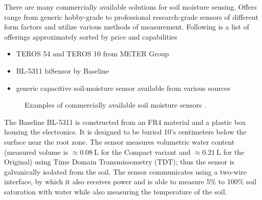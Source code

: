 
There are many commercially available solutions for soil moisture sensing. Offers range from generic hobby-grade to professional research-grade sensors of different form factors and utilize various methods of measurement. Following is a list of offerings approximately sorted by price and capabilities
\begin{itemize}
    \item TEROS 54 and TEROS 10 from METER Group \cite{meter_group_teros_2024, meter_group_teros_nodate}
    \item BL-5311 biSensor by Baseline \cite{baseline_soil_2021}
    \item generic capacitive soil-moisture sensor available from various sources \cite{czechproject_spol_sro_pudni_2024}
\end{itemize}

\begin{figure}[H]
    \centering
    \caption{\label{fig:soil-sensors}Examples of commercially available soil moisture sensors \cite{meter_group_teros_nodate, baseline_soil_2021, czechproject_spol_sro_pudni_2024}.}
\end{figure}

The Baseline BL-5311 is constructed from an FR4 material and a plastic box housing the electronics. It is designed to be buried 10's centimeters below the surface near the root zone. The sensor measures volumetric water content (measured volume is $\approx 0.08~\mathrm{L}$ for the Compact variant and $\approx 0.21~\mathrm{L}$ for the Original) using Time Domain Transmissometry (TDT); thus the sensor is galvanically isolated from the soil. The sensor communicates using a two-wire interface, by which it also receives power and is able to measure 5\% to 100\% soil saturation with water while also measuring the temperature of the soil.

